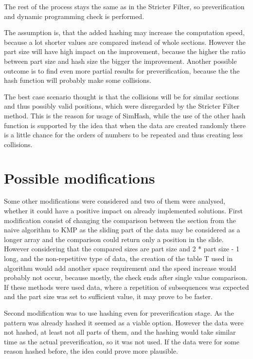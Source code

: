 The rest of the process stays the same as in the Stricter Filter, so preverification and dynamic programming check is performed.

The assumption is, that the added hashing may increase the computation speed, because a lot shorter values are compared instead of whole sections. However the part size will have high impact on the improvement, because the higher the ratio between part size and hash size the bigger the improvement. Another possible outcome is to find even more partial results for preverification, because the the hash function will probably make some collisions.

The best case scenario thought is that the collisions will be for similar sections and thus possibly valid positions, which were disregarded by the Stricter Filter method. This is the reason for usage of SimHash, while the use of the other hash function is supported by the idea that when the data are created randomly there is a little chance for the orders of numbers to be repeated and thus creating less collisions.


\section{Possible modifications}
Some other modifications were considered and two of them were analysed, whether it could have a positive impact on already implemented solutions. First modification consist of changing the comparison between the section from the naive algorithm to KMP as the sliding part of the data may be considered as a longer array and the comparison could return only a position in the slide. However considering that the compared sizes are part size and 2 * part size - 1 long, and the non-repetitive type of data, the creation of the table T used in algorithm would add another space requirement and the speed increase would probably not occur, because mostly, the check ends after single value comparison. If these methods were used data, where a repetition of subsequences was expected and the part size was set to sufficient value, it may prove to be faster.

Second modification was to use hashing even for preverification stage. As the pattern was already hashed it seemed as a viable option. However the data were not hashed, at least not all parts of them, and the hashing would take similar time as the actual preverification, so it was not used. If the data were for some reason hashed before, the idea could prove more plausible.
